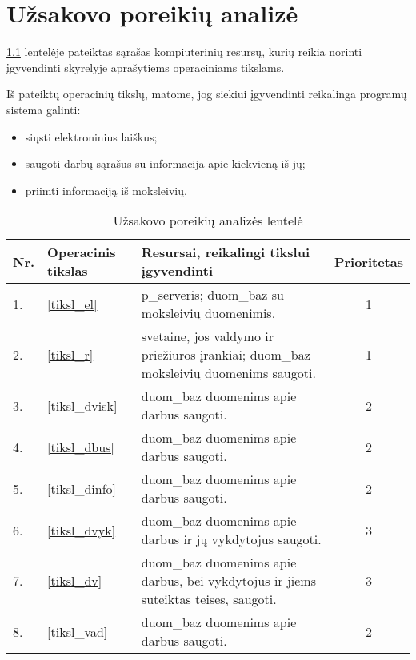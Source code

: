 \chapter{Užsakovo poreikių analizė}


\ref{tab:poreikiai} lentelėje pateiktas sąrašas kompiuterinių resursų, 
kurių reikia norinti įgyvendinti \emph{}
skyrelyje aprašytiems operaciniams tikslams.

Iš pateiktų operacinių tikslų, matome, jog siekiui įgyvendinti reikalinga
programų sistema galinti:
\begin{itemize}
  \item siųsti elektroninius laiškus;
  \item saugoti darbų sąrašus su informacija apie kiekvieną iš jų;
  \item priimti informaciją iš moksleivių.
\end{itemize}

\begin{table}
  \centering
  \begin{tabular}[]{| l | p{1.6cm} | p{5.8cm} | c |}
    \hline
    Nr. & Operacinis tikslas & Resursai, reikalingi tikslui įgyvendinti &
    Prioritetas \\
    \hline
    1. & \ref{tiksl_el} & 
      \Gls{p_serveris}; \gls{duom_baz} su moksleivių duomenimis. & 1 \\
    \hline
    2. & \ref{tiksl_r} & 
      \Gls{svetaine}, jos valdymo ir priežiūros įrankiai; 
      \gls{duom_baz} moksleivių duomenims saugoti. & 1 \\
    \hline
    3. & \ref{tiksl_dvisk} &
      \Gls{duom_baz} duomenims apie darbus saugoti. & 2 \\
    \hline
    4. & \ref{tiksl_dbus} &
      \Gls{duom_baz} duomenims apie darbus saugoti. & 2 \\
    \hline
    5. & \ref{tiksl_dinfo} &
      \Gls{duom_baz} duomenims apie darbus saugoti. & 2 \\
    \hline
    6. & \ref{tiksl_dvyk} &
      \Gls{duom_baz} duomenims apie darbus ir jų vykdytojus 
      saugoti. & 3 \\
    \hline
    7. & \ref{tiksl_dv} &
      \Gls{duom_baz} duomenims apie darbus, bei vykdytojus ir 
      jiems suteiktas teises, saugoti. & 3 \\
    \hline
    8. & \ref{tiksl_vad} &
      \Gls{duom_baz} duomenims apie darbus saugoti. & 2 \\
    \hline
  \end{tabular}
  \caption{Užsakovo poreikių analizės lentelė}
  \label{tab:poreikiai}
\end{table}

